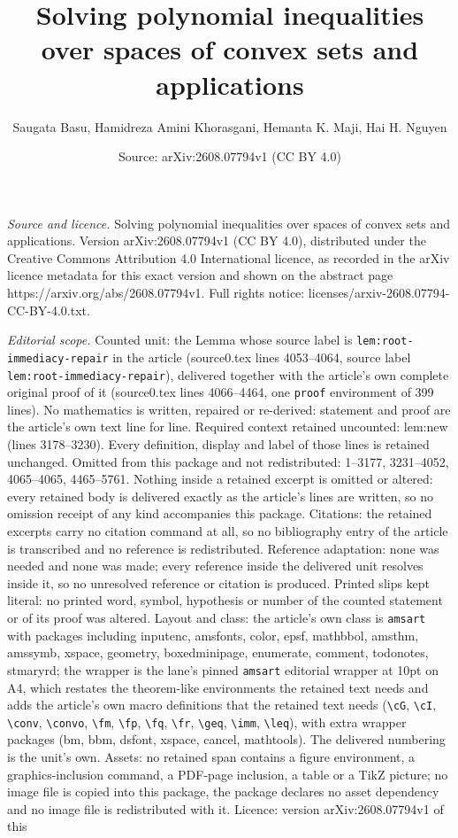 \documentclass[10pt,a4paper]{amsart}
\title[Solving polynomial inequalities over spaces of convex sets a]{Solving polynomial inequalities over spaces of convex sets and applications}
\author{Saugata Basu, Hamidreza Amini Khorasgani, Hemanta K. Maji, Hai H. Nguyen}
\date{Source: arXiv:2608.07794v1 (CC BY 4.0)}
\begin{document}
\maketitle

\noindent\emph{Source and licence.} Solving polynomial inequalities over spaces of convex sets and applications. Version arXiv:2608.07794v1 (CC BY 4.0), distributed under the Creative Commons Attribution 4.0 International licence, as recorded in the arXiv licence metadata for this exact version and shown on the abstract page https://arxiv.org/abs/2608.07794v1. Full rights notice: licenses/arxiv-2608.07794-CC-BY-4.0.txt.\par\smallskip

\noindent\textit{Editorial scope.} Counted unit: the Lemma whose source label is \texttt{lem:root-immediacy-repair} in the article (source0.tex lines 4053--4064, source label \texttt{lem:root-immediacy-repair}), delivered together with the article's own complete original proof of it (source0.tex lines 4066--4464, one \texttt{proof} environment of 399 lines). No mathematics is written, repaired or re-derived: statement and proof are the article's own text line for line. Required context retained uncounted: lem:new (lines 3178--3230). Every definition, display and label of those lines is retained unchanged. Omitted from this package and not redistributed: 1--3177, 3231--4052, 4065--4065, 4465--5761. Nothing inside a retained excerpt is omitted or altered: every retained body is delivered exactly as the article's lines are written, so no omission receipt of any kind accompanies this package. Citations: the retained excerpts carry no citation command at all, so no bibliography entry of the article is transcribed and no reference is redistributed. Reference adaptation: none was needed and none was made; every reference inside the delivered unit resolves inside it, so no unresolved reference or citation is produced. Printed slips kept literal: no printed word, symbol, hypothesis or number of the counted statement or of its proof was altered. Layout and class: the article's own class is \texttt{amsart} with packages including inputenc, amsfonts, color, epsf, mathbbol, amsthm, amssymb, xspace, geometry, boxedminipage, enumerate, comment, todonotes, stmaryrd; the wrapper is the lane's pinned \texttt{amsart} editorial wrapper at 10pt on A4, which restates the theorem-like environments the retained text needs and adds the article's own macro definitions that the retained text needs (\texttt{\textbackslash cG}, \texttt{\textbackslash cI}, \texttt{\textbackslash conv}, \texttt{\textbackslash convo}, \texttt{\textbackslash fm}, \texttt{\textbackslash fp}, \texttt{\textbackslash fq}, \texttt{\textbackslash fr}, \texttt{\textbackslash geq}, \texttt{\textbackslash imm}, \texttt{\textbackslash leq}), with extra wrapper packages (bm, bbm, dsfont, xspace, cancel, mathtools). The delivered numbering is the unit's own. Assets: no retained span contains a figure environment, a graphics-inclusion command, a PDF-page inclusion, a table or a TikZ picture; no image file is copied into this package, the package declares no asset dependency and no image file is redistributed with it. Licence: version arXiv:2608.07794v1 of this 
\end{document}

